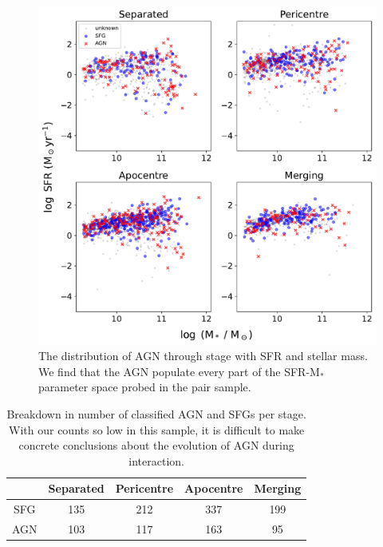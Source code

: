 \begin{figure}
\centering
\includegraphics[width=\textwidth]{Chapter3/figures/agn-stage-dist.pdf}
\caption[The distribution of AGN through stage with SFR and stellar mass.]{The distribution of AGN through stage with SFR and stellar mass. We find that the AGN populate every part of the SFR-M$_{*}$ parameter space probed in the pair sample.}
\label{fig:agn-stage}
\end{figure}

\begin{table}
\centering
\begin{tabular}{|c|c|c|c|c|}
\hline
& Separated & Pericentre & Apocentre & Merging \\
\hline
SFG & 135 & 212 & 337 & 199 \\
AGN & 103 & 117 & 163 & 95 \\
\hline
\end{tabular}
\caption{Breakdown in number of classified AGN and SFGs per stage. With our counts so low in this sample, it is difficult to make concrete conclusions about the evolution of AGN during interaction.}
\label{tab:agn-sfg-breakdown}
\end{table}

